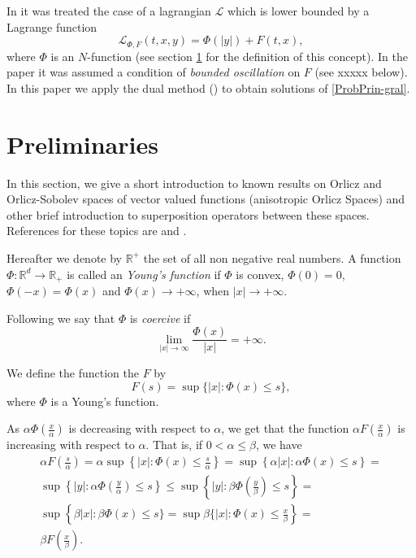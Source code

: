 \documentclass[twoside]{article}
\theoremstyle{remark}
\renewcommand{\leq}{\leqslant}
\begin{document}
In \cite{ABGMS2015} it was treated  the case of a lagrangian $\mathcal{L}$ which is lower bounded by a Lagrange function
\begin{equation}\label{eq:lagrange_phi}
\mathcal{L}_{\Phi,F}(t,x,y)=\Phi(|y|)+F(t,x),
\end{equation}
where  $\Phi$ is an $N$-function (see section \ref{preliminares} for the definition of this concept).  
In the paper \cite{ABGMS2015} it was assumed  a condition of \emph{bounded oscillation} on $F$  (see xxxxx below). 
In this paper  we apply the dual method (\cite[Ch. 3]{mawhin2010critical}) to obtain solutions of \eqref{ProbPrin-gral}.



\section{Preliminaries}\label{preliminares}

In this section, we give a short introduction to known results on Orlicz and Orlicz-Sobolev spaces of vector valued functions (anisotropic Orlicz Spaces) and other brief introduction to superposition operators between these spaces. References for  these topics are \cite{Orliczvectorial2005,Skaff1969, Desch2001} and
\cite{zbMATH04038592,zbMATH04009182,zbMATH03983966,zbMATH03942215}. 

Hereafter we denote  by $\mathbb{R}^+$  the set of all non negative real numbers. A function $\Phi:\mathbb{R}^d\to \mathbb{R}_+ $ is called an \emph{Young's function} if $\Phi$ is convex, $\Phi(0)=0$, $\Phi(-x)=\Phi(x)$ and $\Phi(x)\to +\infty$, when $|x|\to+\infty$.

Following \cite{Orliczvectorial2005} we say that $\Phi$ is \emph{coercive} if
\[\lim_{|x|\to\infty}\frac{\Phi(x)}{|x|}=+\infty.\]

We define the function the $F$ by
\begin{equation}\label{eq:inversa-gral}
F(s)=\sup\{|x|:\Phi(x)\leq s\},
\end{equation}
where $\Phi$ is a Young's function. 


As $\alpha \Phi(\frac{x}{\alpha})$ is decreasing with respect to $\alpha$, 
we get that the function $\alpha F(\frac{x}{\alpha})$ is increasing 
with respect to $\alpha$. That is,
if $0<\alpha \leq \beta$, we have
\[
\begin{split}
\alpha F\left(\frac{s}{\alpha}\right)=
\alpha\sup\left\{|x|:\Phi(x)\leq \frac{s}{\alpha}\right\}=\sup\left\{\alpha|x|:\alpha\Phi(x)\leq s\right\}=
\\
\sup\left\{|y|:\alpha\Phi\left(\frac{y}{\alpha}\right)\leq s\right\}
\leq \sup\left\{|y|:\beta\Phi\left(\frac{y}{\beta}\right)\leq s\right\}=
\\
\sup\left\{\beta|x|:\beta \Phi(x)\leq s\}=\sup\beta \{|x|:\Phi(x)\leq\frac{x}{\beta} \right\}=
\\
\beta F\left(\frac{x}{\beta}\right).
\end{split}
\]
\end{document}
